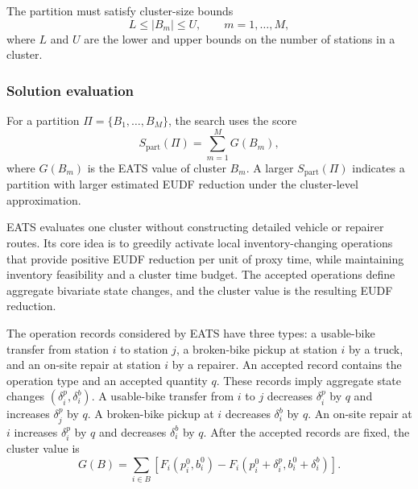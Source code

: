 The partition must satisfy cluster-size bounds
\begin{equation}
L\le |B_m|\le U,
\qquad m=1,\ldots,M,
\label{eq:partition-size-bounds}
\end{equation}
where $L$ and $U$ are the lower and upper bounds on the number of stations in a
cluster.

\subsubsection{Solution evaluation}\label{sec:hgs-euc-evaluation}

For a partition $\Pi=\{B_1,\ldots,B_M\}$, the search uses the score
\begin{equation}
S_{\mathrm{part}}(\Pi)=\sum_{m=1}^{M}G(B_m),
\label{eq:partition-score}
\end{equation}
where $G(B_m)$ is the EATS value of cluster $B_m$. A larger
$S_{\mathrm{part}}(\Pi)$ indicates a partition with larger estimated EUDF
reduction under the cluster-level approximation.

EATS evaluates one cluster without constructing detailed vehicle or repairer
routes. Its core idea is to greedily activate local inventory-changing operations
that provide positive EUDF reduction per unit of proxy time, while maintaining
inventory feasibility and a cluster time budget. The accepted operations define
aggregate bivariate state changes, and the cluster value is the resulting EUDF
reduction.

The operation records considered by EATS have three types: a usable-bike transfer
from station $i$ to station $j$, a broken-bike pickup at station $i$ by a truck,
and an on-site repair at station $i$ by a repairer. An accepted record contains
the operation type and an accepted quantity $q$. These records imply aggregate
state changes $(\delta_i^p,\delta_i^b)$. A usable-bike transfer from $i$ to $j$
decreases $\delta_i^p$ by $q$ and increases $\delta_j^p$ by $q$. A broken-bike
pickup at $i$ decreases $\delta_i^b$ by $q$. An on-site repair at $i$ increases
$\delta_i^p$ by $q$ and decreases $\delta_i^b$ by $q$. After the accepted records
are fixed, the cluster value is
\begin{equation}
G(B)=
\sum_{i\in B}
\left[
F_i(p_i^0,b_i^0)
-F_i(p_i^0+\delta_i^p,b_i^0+\delta_i^b)
\right].
\label{eq:cluster-eats-value}
\end{equation}

